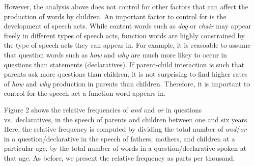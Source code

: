 \documentclass[10pt, letterpaper]{article}
\begin{document}
However, the analysis above does not control for other factors that can
affect the production of words by children. An important factor to
control for is the development of speech acts. While content words such
as \emph{dog} or \emph{chair} may appear freely in different types of
speech acts, function words are highly constrained by the type of speech
acts they can appear in. For example, it is reasoable to assume that
question words such as \emph{how} and \emph{why} are much more likey to
occur in questions than statements (declaratives). If parent-child
interaction is such that parents ask more questions than children, it is
not surprising to find higher rates of \emph{how} and \emph{why}
production in parents than children. Therefore, it is important to
control for the speech act a function word appears in.

Figure 2 shows the relative frequencies of \emph{and} and \emph{or} in
questions vs.~declaratives, in the speech of parents and children
between one and six years. Here, the relative frequency is computed by
dividing the total number of \emph{and}/\emph{or} in a
question/declarative in the speech of fathers, mothers, and children at
a particular age, by the total number of words in a question/declarative
spoken at that age. As before, we present the relative frequency as
parts per thousand.
\end{document}
